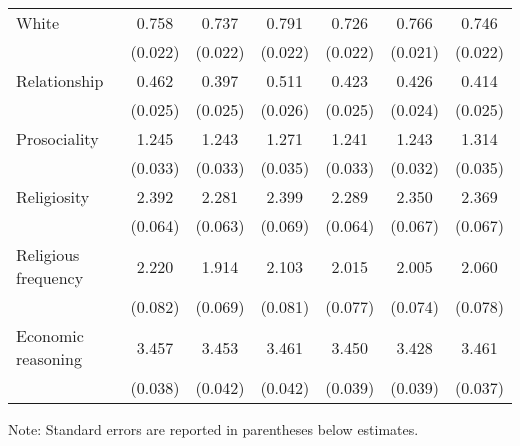 \begin{table*}
{\begin{threeparttable}
\begin{tabular}[t]{lcccccc}
White & 0.758 & 0.737 & 0.791 & 0.726 & 0.766 & 0.746\\
 & (0.022) & (0.022) & (0.022) & (0.022) & (0.021) & (0.022)\\
Relationship & 0.462 & 0.397 & 0.511 & 0.423 & 0.426 & 0.414\\
 & (0.025) & (0.025) & (0.026) & (0.025) & (0.024) & (0.025)\\
Prosociality & 1.245 & 1.243 & 1.271 & 1.241 & 1.243 & 1.314\\
 & (0.033) & (0.033) & (0.035) & (0.033) & (0.032) & (0.035)\\
Religiosity & 2.392 & 2.281 & 2.399 & 2.289 & 2.350 & 2.369\\
 & (0.064) & (0.063) & (0.069) & (0.064) & (0.067) & (0.067)\\
Religious frequency & 2.220 & 1.914 & 2.103 & 2.015 & 2.005 & 2.060\\
 & (0.082) & (0.069) & (0.081) & (0.077) & (0.074) & (0.078)\\
Economic reasoning & 3.457 & 3.453 & 3.461 & 3.450 & 3.428 & 3.461\\
 & (0.038) & (0.042) & (0.042) & (0.039) & (0.039) & (0.037)\\
\bottomrule
\end{tabular}
\begin{tablenotes}
\item Note: Standard errors are reported in parentheses below estimates.
\end{tablenotes}
\end{threeparttable}}
\end{table*}
